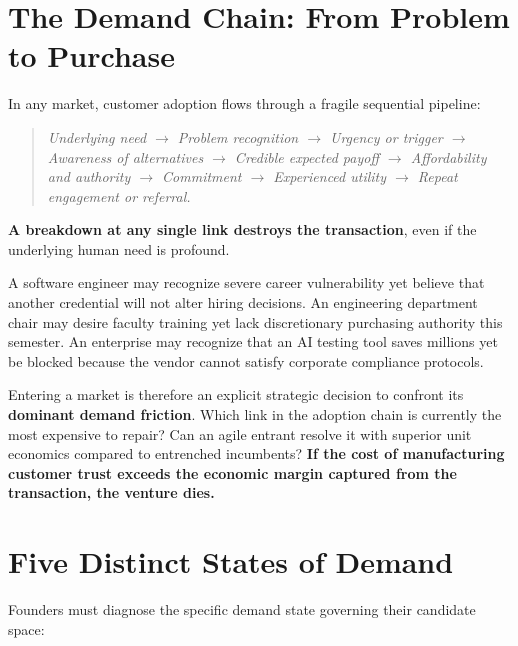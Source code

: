 \section{The Demand Chain: From Problem to Purchase}

In any market, customer adoption flows through a fragile sequential pipeline:

\begin{quote}
\centering\small\itshape
Underlying need $\to$ Problem recognition $\to$ Urgency or trigger $\to$ Awareness of alternatives $\to$ Credible expected payoff $\to$ Affordability and authority $\to$ Commitment $\to$ Experienced utility $\to$ Repeat engagement or referral.
\end{quote}

\textbf{A breakdown at any single link destroys the transaction}, even if the underlying human need is profound.

A software engineer may recognize severe career vulnerability yet believe that another credential will not alter hiring decisions. An engineering department chair may desire faculty training yet lack discretionary purchasing authority this semester. An enterprise may recognize that an AI testing tool saves millions yet be blocked because the vendor cannot satisfy corporate compliance protocols.

Entering a market is therefore an explicit strategic decision to confront its \textbf{dominant demand friction}. Which link in the adoption chain is currently the most expensive to repair? Can an agile entrant resolve it with superior unit economics compared to entrenched incumbents? \textbf{If the cost of manufacturing customer trust exceeds the economic margin captured from the transaction, the venture dies.}

\section{Five Distinct States of Demand}

Founders must diagnose the specific demand state governing their candidate space:


